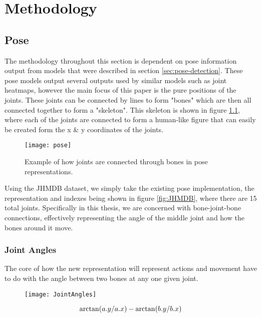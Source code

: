 
\chapter{Methodology}

\label{Methodology}

\section{Pose}

The methodology throughout this section is dependent on pose information output from models that were described in section \ref{sec:pose-detection}. These pose models output several outputs used by similar models such as joint heatmaps, however the main focus of this paper is the pure positions of the joints. These joints can be connected by lines to form "bones" which are then all connected together to form a "skeleton". This skeleton is shown in figure \ref{fig:pose}, where each of the joints are connected to form a human-like figure that can easily be created form the x \& y coordinates of the joints.

\begin{figure}[h]
	\texttt{[image: pose]}
	\centering
	\caption{Example of how joints are connected through bones in pose representations.}
	\label{fig:pose}
\end{figure}

Using the JHMDB dataset, we simply take the existing pose implementation, the representation and indexes being shown in figure \ref{fig:JHMDB}, where there are 15 total joints. Specifically in this thesis, we are concerned with bone-joint-bone connections, effectively representing the angle of the middle joint and how the bones around it move.

\subsection{Joint Angles}

The core of how the new representation will represent actions and movement have to do with the angle between two bones at any one given joint.

\begin{figure}[h]
	\texttt{[image: JointAngles]}
	\centering
	\caption{}
	\label{fig:joint-angles}
\end{figure}

\begin{equation}
	\label{eqn:angle-calculation}
	\centering
	\arctan(a.y/a.x) - \arctan(b.y/b.x)
\end{equation}

